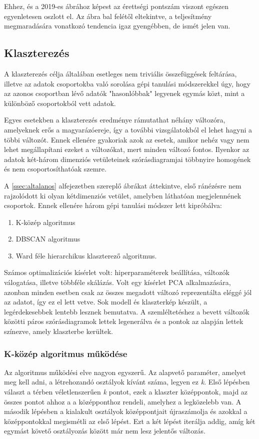 \documentclass[12pt]{article}
\begin{document}
Ehhez, és a 2019-es ábrához képest az érettségi pontszám viszont egészen egyenletesen oszlott el. Az ábra bal felétől eltekintve, a teljesítmény megmaradására vonatkozó tendencia igaz gyengébben, de ismét jelen van.


\subsection{Klaszterezés}

A klaszterezés célja általában esetleges nem triviális összefüggések feltárása, illetve az adatok csoportokba való sorolása gépi tanulási módszerekkel úgy, hogy az azonos csoportban lévő adatók "hasonlóbbak" legyenek egymás közt, mint a különböző csoportokból vett adatok.

Egyes esetekben a klaszterezés eredménye rámutathat néhány változóra, amelyeknek erős a magyarázóereje, így a további vizsgálatokból el lehet hagyni a többi változót. Ennek ellenére gyakoriak azok az esetek, amikor nehéz vagy nem lehet megállapítani ezeket a változókat, mert minden változó fontos. Ilyenkor az adatok két-három dimenziós vetületeinek szórásdiagramjai többnyire homogének és nem csoportosíthatóak szemre.

A \ref{ssec:altalanos} alfejezetben szereplő ábrákat áttekintve, első ránézésre nem rajzolódott ki olyan kétdimenziós vetület, amelyben láthatóan megjelennének csoportok. Ennek ellenére három gépi tanulási módszer lett kipróbálva:
\begin{enumerate}
\item K-közép algoritmus
\item DBSCAN algoritmus
\item Ward féle hierarchikus klaszterező algoritmus.
\end{enumerate}

Számos optimalizációs kísérlet volt: hiperparaméterek beállítása, változók válogatása, illetve többféle skálázás. Volt egy kísérlet PCA alkalmazására, azonban minden esetben csak az összes megadott változó reprezentálta eléggé jól az adatot, így ez el lett vetve. Sok modell és klaszterkép készült, a legérdekesebbek lentebb lesznek bemutatva. A szemléltetéshez a bevett változók közötti páros szórásdiagramok lettek legenerálva és a pontok az alapján lettek színezve, amely klaszterbe kerültek.

\subsubsection{K-közép algoritmus működése}
Az algoritmus működési elve nagyon egyszerű. Az alapvető paraméter, amelyet meg kell adni, a létrehozandó osztályok kívánt száma, legyen ez \textit{k}. Első lépésben választ a térben véletlenszerűen \textit{k} pontot, ezek a klaszter középpontok, majd az összes pontot ahhoz a a középponthoz rendeli, amelyhez a legközelebb van. A második lépésben a kialakult osztályok középpontjait újraszámolja és azokkal a középpontokkal megismétli az első lépést. Ezt a két lépést iterálja addig, amíg két egymást követő osztályozás között már nem lesz jelentős változás.
\end{document}
